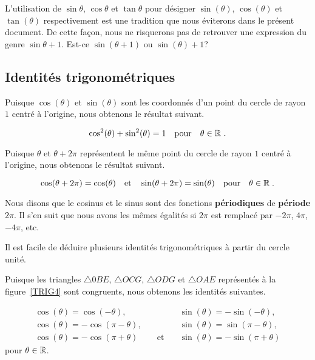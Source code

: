 {\begin{rmk}
L'utilisation de $\sin \theta$, $\cos \theta$ et $\tan \theta$ pour
désigner $\sin(\theta)$, $\cos(\theta)$ et $\tan(\theta)$
respectivement est une tradition que nous éviterons dans le présent
document.  De cette façon, nous ne risquerons pas de retrouver une
expression du genre $\sin \theta + 1$. Est-ce $\sin(\theta+1)$ ou
$\sin(\theta) + 1$?
\end{rmk}

\subsection{Identités trigonométriques}

Puisque $\cos(\theta)$ et $\sin(\theta)$ sont les coordonnés d'un
point du cercle de rayon $1$ centré à l'origine, nous obtenons le
résultat suivant.

\begin{focus}{\prp}
\[
\cos^2(\theta) + \sin^2(\theta) = 1 \quad \text{pour} \quad \theta \in
\mathbb{R} \ .
\]
\end{focus}

Puisque $\theta$ et $\theta+2\pi$ représentent le même point du cercle
de rayon $1$ centré à l'origine, nous obtenons le résultat suivant.

\begin{focus}{\prp}
\[
\cos(\theta + 2\pi) = \cos(\theta) \quad \text{et} \quad
\sin(\theta + 2\pi) = \sin(\theta) \quad \text{pour} \quad \theta \in \mathbb{R} \; .
\]
\end{focus}

Nous disons que le cosinus et le sinus sont des fonctions
{\bfseries périodiques} de {\bfseries période} $2\pi$.
Il s'en suit que nous avons les mêmes égalités si $2\pi$ est remplacé
par $-2\pi$, $4\pi$, $-4\pi$, etc.

Il est facile de déduire plusieurs identités trigonométriques à partir
du cercle unité.

Puisque les triangles $\triangle 0BE$, $\triangle OCG$,
$\triangle ODG$ et $\triangle OAE$ représentés à la figure~\ref{TRIG4} sont
congruents, nous obtenons les identités suivantes.

\begin{focus}{\prp}
\[
\begin{array}{lcl}
\cos(\theta) = \cos(-\theta) ,&& \sin(\theta) = -\sin(-\theta), \\
\cos(\theta) = -\cos(\pi - \theta) ,&& \sin(\theta) = \sin(\pi - \theta),\\
\cos(\theta) = -\cos(\pi + \theta) & \quad\text{et}\quad &
\sin(\theta) = -\sin(\pi+\theta)
\end{array}
\]
pour $\theta \in \mathbb{R}$. \label{fonct_ident_trigsA}
\end{focus}

}
